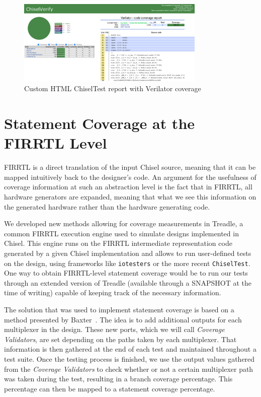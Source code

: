 \documentclass[conference]{IEEEtran}
\begin{document}
\begin{figure}
\centering
\includegraphics[width=0.8\textwidth]{ChiselverifyHtml.pdf}
\caption{Custom HTML ChiselTest report with Verilator coverage}
\label{fig:customhtmlreport}
\end{figure}


\section{Statement Coverage at the FIRRTL Level}  
FIRRTL is a direct translation of the input Chisel source, meaning that it can be mapped intuitively back to the designer's code. An argument for the usefulness of coverage information at such an abstraction level is the fact that in FIRRTL, all hardware generators are expanded, meaning that what we see this information on the generated hardware rather than the hardware generating code. 

We developed new methods allowing for coverage measurements in Treadle, a common FIRRTL execution engine used to simulate designs implemented in Chisel. This engine runs on the FIRRTL intermediate representation code generated by a given Chisel implementation and allows to run user-defined tests on the design, using frameworks like \texttt{iotesters} or the more recent \texttt{ChiselTest}. One way to obtain FIRRTL-level statement coverage would be to run our tests through an extended version of Treadle (available through a SNAPSHOT at the time of writing) capable of keeping track of the necessary information.

The solution that was used to implement statement coverage is based on a method presented by Baxter~\cite{branch-cov-made-easy:2002}. The idea is to add additional outputs for each multiplexer in the design. These new ports, which we will call \textit{Coverage Validators}, are set depending on the paths taken by each multiplexer. That information is then gathered at the end of each test and maintained throughout a test suite. Once the testing process is finished, we use the output values gathered from the \textit{Coverage Validators} to check whether or not a certain multiplexer path was taken during the test, resulting in a branch coverage percentage. This percentage can then be mapped to a statement coverage percentage.
\end{document}
